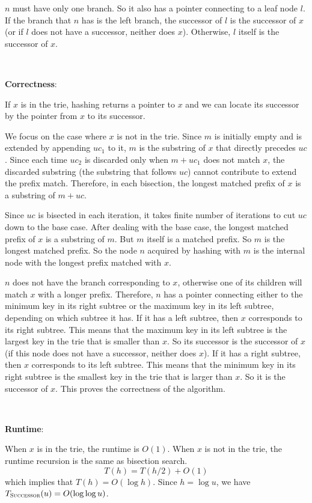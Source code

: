\documentclass{article}
\begin{document}
$n$ must have only one branch. So it also has a pointer connecting to a leaf node $l$. If the branch that $n$ has is the left branch, the successor of $l$ is the successor of $x$ (or if $l$ does not have a successor, neither does $x$). Otherwise, $l$ itself is the successor of $x$.

~

\noindent\textbf{Correctness}:

If $x$ is in the trie, hashing returns a pointer to $x$ and we can locate its successor by the pointer from $x$ to its successor.

We focus on the case where $x$ is not in the trie. Since $m$ is initially empty and is extended by appending $uc_1$ to it, $m$ is the substring of $x$ that directly precedes $uc$. Since each time $uc_2$ is discarded only when $m+uc_1$ does not match $x$, the discarded substring (the substring that follows $uc$) cannot contribute to extend the prefix match. Therefore, in each bisection, the longest matched prefix of $x$ is a substring of $m+uc$.

Since $uc$ is bisected in each iteration, it takes finite number of iterations to cut $uc$ down to the base case. After dealing with the base case, the longest matched prefix of $x$ is a substring of $m$. But $m$ itself is a matched prefix. So $m$ is the longest matched prefix. So the node $n$ acquired by hashing with $m$ is the internal node with the longest prefix matched with $x$.

$n$ does not have the branch corresponding to $x$, otherwise one of its children will match $x$ with a longer prefix. Therefore, $n$ has a pointer connecting either to the minimum key in its right subtree or the maximum key in its left subtree, depending on which subtree it has. If it has a left subtree, then $x$ corresponds to its right subtree. This means that the maximum key in its left subtree is the largest key in the trie that is smaller than $x$. So its successor is the successor of $x$ (if this node does not have a successor, neither does $x$). If it has a right subtree, then $x$ corresponds to its left subtree. This means that the minimum key in its right subtree is the smallest key in the trie that is larger than $x$. So it is the successor of $x$. This proves the correctness of the algorithm.

~

\noindent\textbf{Runtime}:

When $x$ is in the trie, the runtime is $O(1)$. When $x$ is not in the trie, the runtime recursion is the same as bisection search.
\begin{equation*}
T(h)=T(h/2)+O(1)
\end{equation*}
which implies that $T(h)=O(\log h)$. Since $h=\log u$, we have $T_{\textsc{Successor}}(u)=O(\log\log u)$.
\end{document}
